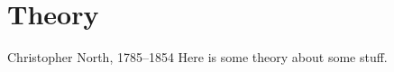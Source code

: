 \chapter{Theory}
\label{chap:theory}


%
{Christopher North, 1785--1854}%
Here is some theory about some stuff.
